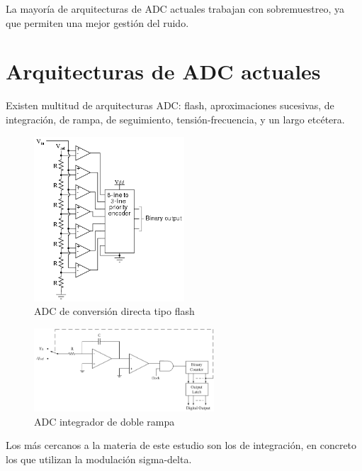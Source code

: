 \documentclass[12pt]{report} %
\begin{document}
	La mayoría de arquitecturas de ADC actuales trabajan con sobremuestreo, ya que permiten una mejor gestión del ruido.
	
	\section{Arquitecturas de ADC actuales}
	
	Existen multitud de arquitecturas ADC: flash, aproximaciones sucesivas, de integración, de rampa, de seguimiento, tensión-frecuencia, y un largo etcétera.
	
	\begin{figure}[H]
		\includegraphics[width=0.5\textwidth]{flash-adc.png}
		\caption[ADC de conversión directa tipo flash]{ADC de conversión directa tipo flash\protect\footnotemark}
		\label{fig:flash-adc.png}
	\end{figure}
	\begin{figure}[H]
		\includegraphics[width=0.6\textwidth]{integrator-adc-double-ramp.png}
		\caption[ADC integrador de doble rampa]{ADC integrador de doble rampa\protect\footnotemark}
		\label{fig:integrator-adc-double-ramp.png}
	\end{figure}
	
	Los más cercanos a la materia de este estudio son los de integración, en concreto los que utilizan la modulación sigma-delta.
	
\end{document}
